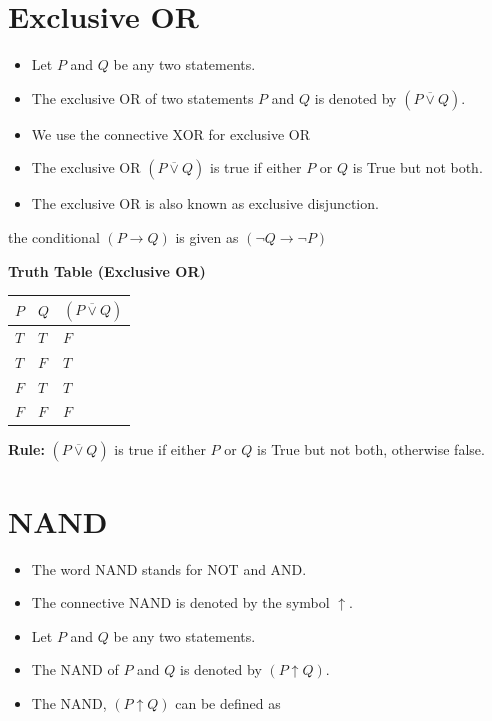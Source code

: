 \documentclass[]{book}
\providecommand{\tightlist}{%
  \setlength{\itemsep}{0pt}\setlength{\parskip}{0pt}}
\begin{document}
\hypertarget{exclusive-or}{%
\section{Exclusive OR}\label{exclusive-or}}

\begin{itemize}
\tightlist
\item
  Let \(P\) and \(Q\) be any two statements.
\item
  The exclusive OR of two statements \(P\) and \(Q\) is denoted by \((P \overline{\lor} Q)\).
\item
  We use the connective XOR for exclusive OR
\item
  The exclusive OR \((P \overline{\lor} Q)\) is true if either \(P\) or \(Q\) is True but not both.
\item
  The exclusive OR is also known as exclusive disjunction.
\end{itemize}

the conditional \((P \rightarrow Q)\) is given as \((\lnot Q \rightarrow \lnot P)\)

\textbf{Truth Table (Exclusive OR)}

\begin{longtable}[]{@{}lll@{}}
\toprule
\(P\) & \(Q\) & \((P \overline{\lor}Q)\)\tabularnewline
\midrule
\endhead
\(T\) & \(T\) & \(F\)\tabularnewline
\(T\) & \(F\) & \(T\)\tabularnewline
\(F\) & \(T\) & \(T\)\tabularnewline
\(F\) & \(F\) & \(F\)\tabularnewline
\bottomrule
\end{longtable}

\textbf{Rule:} \((P \overline{\lor}Q)\) is true if either \(P\) or \(Q\) is True but not both, otherwise false.

\hypertarget{nand}{%
\section{NAND}\label{nand}}

\begin{itemize}
\tightlist
\item
  The word NAND stands for NOT and AND.
\item
  The connective NAND is denoted by the symbol \(\uparrow\).
\item
  Let \(P\) and \(Q\) be any two statements.
\item
  The NAND of \(P\) and \(Q\) is denoted by \((P \uparrow Q)\).
\item
  The NAND, \((P \uparrow Q)\) can be defined as
\end{itemize}
\end{document}

